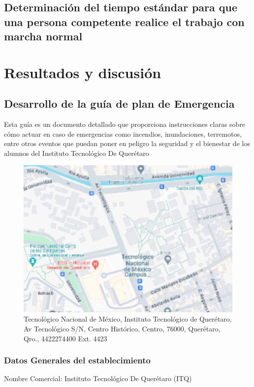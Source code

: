     \subsection{Determinación del tiempo estándar para que una persona competente realice el trabajo con marcha normal}
    
    
    \section{Resultados y discusión}
    
    
    \subsection{Desarrollo de la guía de plan de Emergencia}
    Esta guía es un documento detallado que proporciona instrucciones claras sobre cómo actuar en caso de emergencias como incendios, inundaciones, terremotos, entre otros eventos que puedan poner en peligro la seguridad y el bienestar de los alumnos del Instituto Tecnológico De Querétaro
    \begin{figure}[H]
        \centering
        \includegraphics[scale=0.1]{9/Img/mapaItq.pdf}
        \caption{Tecnológico Nacional de México, Instituto Tecnológico de Querétaro, Av Tecnológico S/N, Centro Histórico, Centro, 76000, Querétaro, Qro., 4422274400 Ext. 4423}
        \label{fig:mapa-itq}
    \end{figure}
    
    \subsubsection{Datos Generales del establecimiento}
    Nombre Comercial: Instituto Tecnológico De Querétaro (ITQ) 
    
